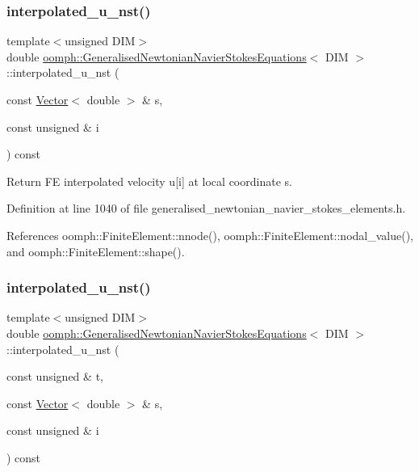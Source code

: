 \subsubsection{\texorpdfstring{interpolated\+\_\+u\+\_\+nst()}{interpolated\_u\_nst()}\hspace{0.1cm}{\footnotesize\ttfamily [2/3]}}
{\footnotesize\ttfamily template$<$unsigned D\+IM$>$ \\
double \hyperlink{classoomph_1_1GeneralisedNewtonianNavierStokesEquations}{oomph\+::\+Generalised\+Newtonian\+Navier\+Stokes\+Equations}$<$ D\+IM $>$\+::interpolated\+\_\+u\+\_\+nst (\begin{DoxyParamCaption}\item[{const \hyperlink{classoomph_1_1Vector}{Vector}$<$ double $>$ \&}]{s,  }\item[{const unsigned \&}]{i }\end{DoxyParamCaption}) const\hspace{0.3cm}{\ttfamily [inline]}}



Return FE interpolated velocity u\mbox{[}i\mbox{]} at local coordinate s. 



Definition at line 1040 of file generalised\+\_\+newtonian\+\_\+navier\+\_\+stokes\+\_\+elements.\+h.



References oomph\+::\+Finite\+Element\+::nnode(), oomph\+::\+Finite\+Element\+::nodal\+\_\+value(), and oomph\+::\+Finite\+Element\+::shape().

\mbox{\label{classoomph_1_1GeneralisedNewtonianNavierStokesEquations_ae10227e1807c37cd6acd9fafa553a482}} 
\subsubsection{\texorpdfstring{interpolated\+\_\+u\+\_\+nst()}{interpolated\_u\_nst()}\hspace{0.1cm}{\footnotesize\ttfamily [3/3]}}
{\footnotesize\ttfamily template$<$unsigned D\+IM$>$ \\
double \hyperlink{classoomph_1_1GeneralisedNewtonianNavierStokesEquations}{oomph\+::\+Generalised\+Newtonian\+Navier\+Stokes\+Equations}$<$ D\+IM $>$\+::interpolated\+\_\+u\+\_\+nst (\begin{DoxyParamCaption}\item[{const unsigned \&}]{t,  }\item[{const \hyperlink{classoomph_1_1Vector}{Vector}$<$ double $>$ \&}]{s,  }\item[{const unsigned \&}]{i }\end{DoxyParamCaption}) const\hspace{0.3cm}{\ttfamily [inline]}}



